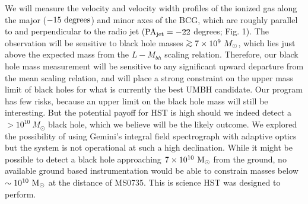\documentclass[12pt]{article}
\begin{document}
We will measure the velocity and velocity width profiles of the ionized gas along the major ($-15~\rm degrees$) and minor axes of the BCG, which are
roughly parallel to and perpendicular to the radio jet ($\rm PA_{jet}= - 22$ degrees; Fig. 1).  The observation will be sensitive to black hole masses
 $\gae 7\times 10^9~M_{\odot}$, which lies just above the expected mass from the $L-M_{bh}$ scaling relation.
Therefore, our black hole mass measurement will be sensitive to any significant upward departure from the mean scaling relation,
and will place a strong constraint on the upper mass limit of black holes for what is currently
the best UMBH candidate.  Our program has few risks, because an upper limit on the black hole mass will still be interesting.
But the potential payoff for HST is high should we indeed detect a $>10^{10}~M_\odot$ black hole, which we believe will be the likely outcome.  
We explored the possibility of using Gemini's integral field spectrograph with adaptive optics but
the system is not operational at such a high declination.  While it might be possible to detect a black hole approaching
$7\times 10^{10}~\rm M_\odot$ from the ground, no available ground based instrumentation would be able to constrain masses
below $\sim 10^{10}~\rm M_\odot$ at the distance of MS0735.  This is science HST was designed to perform.
\end{document}
